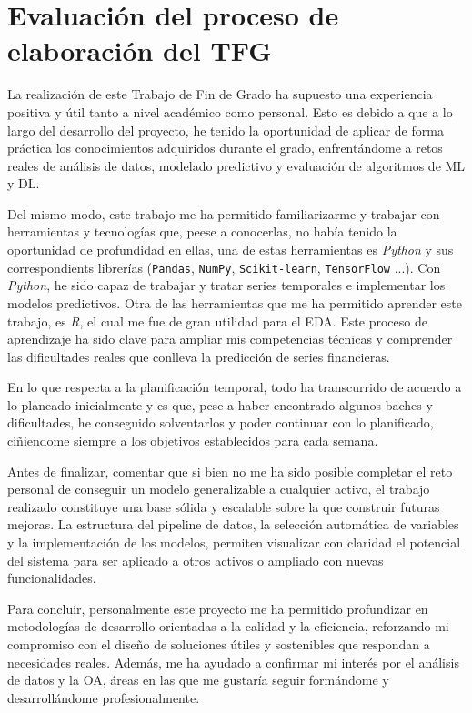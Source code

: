 \section{Evaluación del proceso de elaboración del TFG}
La realización de este Trabajo de Fin de Grado ha supuesto una experiencia positiva y útil tanto a nivel académico como personal. Esto es debido a que a lo largo del desarrollo del proyecto, he tenido la oportunidad de aplicar de forma práctica los conocimientos adquiridos durante el grado, enfrentándome a retos reales de análisis de datos, modelado predictivo y evaluación de algoritmos de ML y DL.

Del mismo modo, este trabajo me ha permitido familiarizarme y trabajar con herramientas y tecnologías que, peese a conocerlas, no había tenido la oportunidad de profundidad en ellas, una de estas herramientas es \emph{Python} y sus correspondients librerías (\texttt{Pandas}, \texttt{NumPy}, \texttt{Scikit-learn}, \texttt{TensorFlow} ...). Con \emph{Python}, he sido capaz de trabajar y tratar series temporales e implementar los modelos predictivos. Otra de las herramientas que me ha permitido aprender este trabajo, es \emph{R}, el cual me fue de gran utilidad para el EDA. Este proceso de aprendizaje ha sido clave para ampliar mis competencias técnicas y comprender las dificultades reales que conlleva la predicción de series financieras.

En lo que respecta a la planificación temporal, todo ha transcurrido de acuerdo a lo planeado inicialmente y es que, pese a haber encontrado algunos baches y dificultades, he conseguido solventarlos y poder continuar con lo planificado, ciñiendome siempre a los objetivos establecidos para cada semana.

Antes de finalizar, comentar que si bien no me ha sido posible completar el reto personal de conseguir un modelo generalizable a cualquier activo, el trabajo realizado constituye una base sólida y escalable sobre la que construir futuras mejoras. La estructura del pipeline de datos, la selección automática de variables y la implementación de los modelos, permiten visualizar con claridad el potencial del sistema para ser aplicado a otros activos o ampliado con nuevas funcionalidades.

Para concluir, personalmente este proyecto me ha permitido profundizar en metodologías de desarrollo orientadas a la calidad y la eficiencia, reforzando mi compromiso con el diseño de soluciones útiles y sostenibles que respondan a necesidades reales. Además, me ha ayudado a confirmar mi interés por el análisis de datos y la OA, áreas en las que me gustaría seguir formándome y desarrollándome profesionalmente.

